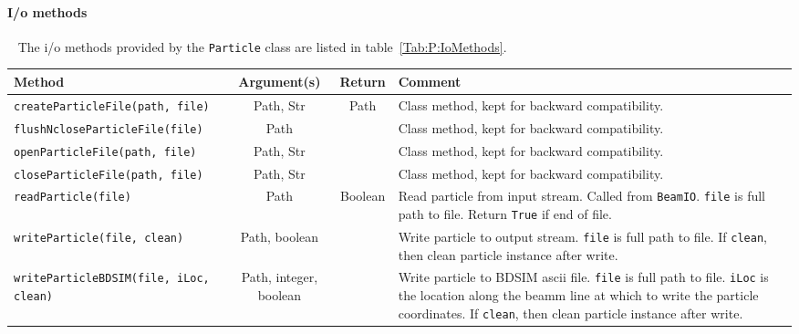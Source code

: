 \paragraph{I/o methods} ~\newline
\noindent
The i/o methods provided by the \texttt{Particle} class are listed in
table~\ref{Tab:P:IoMethods}.
\begin{sidewaystable}[h]
  \caption{
    I/o methods provided by the \texttt{Particle} class. 
  }
  \label{Tab:P:IoMethods}
  \begin{center}
    \begin{tabular}{|l|c|c|p{10cm}|}
      \hline
      \textbf{Method} & \textbf{Argument(s)} & \textbf{Return} & \textbf{Comment}                                          \\
      \hline
      \texttt{createParticleFile(path, file)} & Path, Str & Path    & Class method, kept for backward compatibility.          \\
      \texttt{flushNcloseParticleFile(file)}  & Path      &         & Class method, kept for backward compatibility.          \\
      \texttt{openParticleFile(path, file)}   & Path, Str &         & Class method, kept for backward compatibility.          \\
      \texttt{closeParticleFile(path, file)}  & Path, Str &         & Class method, kept for backward compatibility.          \\
      \texttt{readParticle(file)}             & Path      & Boolean & Read particle from input stream.  Called from \texttt{BeamIO}.
                                                                   \texttt{file} is full path to file. Return \texttt{True} if end
                                                                   of file.                                                   \\
      \texttt{writeParticle(file, clean)} & Path, boolean &      & Write particle to output stream.  
                                                                   \texttt{file} is full path to file. If \texttt{clean}, then
                                                                   clean particle instance after write.                    \\
      \texttt{writeParticleBDSIM(file, iLoc, clean)} & Path, integer, boolean &  & Write particle to BDSIM ascii file.
                                                                   \texttt{file} is full path to file.
                                                                   \texttt{iLoc} is the location along the beamm line at which
                                                                   to write the particle coordinates.
                                                                   If \texttt{clean}, then clean particle instance after write. \\
      \hline
    \end{tabular}
  \end{center}
\end{sidewaystable}


